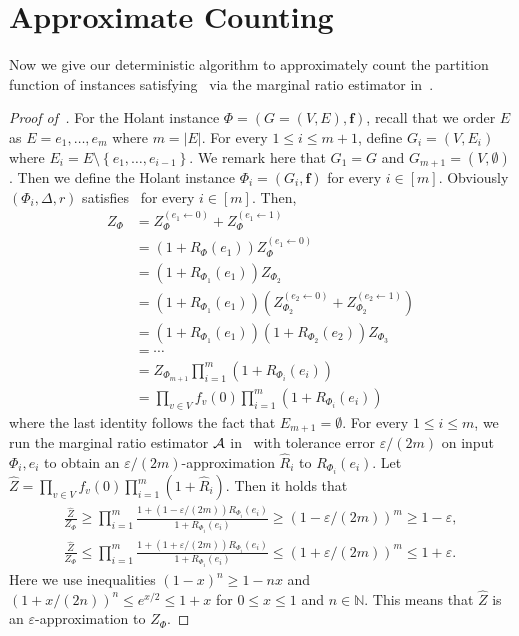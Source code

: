 \documentclass[11pt]{article}
\newcommand{\abs}[1]{\left\vert#1\right\vert}
\newcommand{\set}[1]{\left\{#1\right\}}
\newcommand{\wh}[1]{\widehat{#1}}
\newcommand{\vecf}{\boldsymbol{f}}
\begin{document}
\section{Approximate Counting}

Now we give our deterministic algorithm to approximately count the partition function of instances satisfying~ via the marginal ratio estimator in~.

\begin{proof}[Proof of~]
    For the Holant instance $\Phi = (G = (V, E), \vecf)$, recall that we order $E$ as $E = e_1, \ldots, e_m$ where $m = \abs{E}$. For every $1 \le i \le m + 1$, define $G_i = (V, E_i)$ where $E_i = E \setminus \set{e_1, \ldots, e_{i - 1}}$. We remark here that $G_1 = G$ and $G_{m + 1} = (V, \emptyset)$. Then we define the Holant instance $\Phi_i = (G_i, \vecf)$ for every $i \in [m]$. Obviously $(\Phi_i, \Delta, r)$ satisfies~ for every $i \in [m]$. Then,
    \begin{align*}
        Z_{\Phi} &= Z_{\Phi}^{(e_1 \gets 0)} + Z_{\Phi}^{(e_1 \gets 1)} \\
        &= \left(1 + R_{\Phi}(e_1)\right) Z_{\Phi}^{(e_1 \gets 0)} \\
        &= \left(1 + R_{\Phi_1}(e_1)\right) Z_{\Phi_2} \\
        &= \left(1 + R_{\Phi_1}(e_1)\right) \left(Z_{\Phi_2}^{(e_2 \gets 0)} + Z_{\Phi_2}^{(e_2 \gets 1)}\right) \\
        &= \left(1 + R_{\Phi_1}(e_1)\right) \left(1 + R_{\Phi_2}(e_2)\right) Z_{\Phi_3} \\
        &= \cdots \\
        &= Z_{\Phi_{m + 1}}\prod_{i = 1}^{m} \left(1 + R_{\Phi_i}(e_i)\right) \\
        &= \prod_{v \in V} f_v(0) \prod_{i = 1}^{m} \left(1 + R_{\Phi_i}(e_i)\right)
    \end{align*}
    where the last identity follows the fact that $E_{m + 1} = \emptyset$. For every $1 \le i \le m$, we run the marginal ratio estimator $\mathcal{A}$ in~ with tolerance error $\varepsilon/(2m)$ on input $\Phi_i, e_i$ to obtain an $\varepsilon/(2m)$-approximation $\wh{R}_i$ to $R_{\Phi_i}(e_i)$. Let $\wh{Z} = \prod_{v \in V} f_v(0) \prod_{i = 1}^{m} (1 + \wh{R}_i)$. Then it holds that
    \begin{gather*}
        \frac{\wh{Z}}{Z_\Phi} \ge \prod_{i = 1}^{m} \frac{1 + (1 - \varepsilon/(2m)) R_{\Phi_i}(e_i)}{1 + R_{\Phi_i}(e_i)} \ge (1 - \varepsilon/(2m))^m \ge 1 - \varepsilon, \\
        \frac{\wh{Z}}{Z_\Phi} \le \prod_{i = 1}^{m} \frac{1 + (1 + \varepsilon/(2m)) R_{\Phi_i}(e_i)}{1 + R_{\Phi_i}(e_i)} \le (1 + \varepsilon/(2m))^m \le 1 + \varepsilon.
    \end{gather*}
    Here we use inequalities $(1 - x)^{n} \ge 1 - nx$ and $(1 + x/(2n))^n \le e^{x/2} \le 1 + x$ for $0 \le x \le 1$ and $n \in \mathbb{N}$. This means that $\wh{Z}$ is an $\varepsilon$-approximation to $Z_{\Phi}$.


\end{proof}
\end{document}
